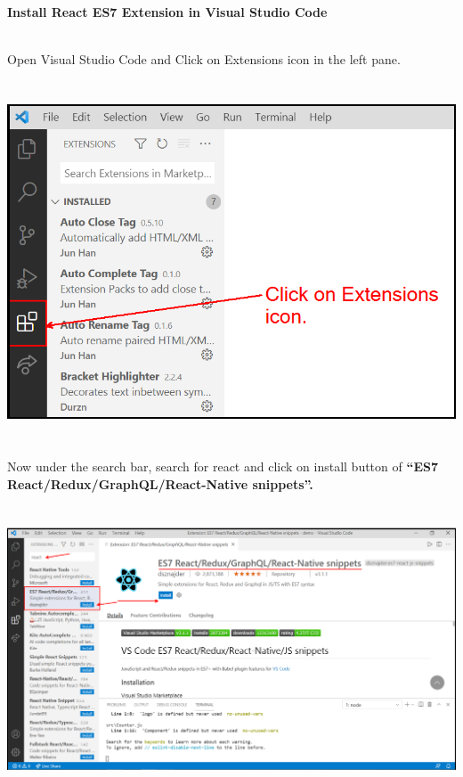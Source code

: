 \documentclass{article}
\begin{document}
\noindent \textbf{Install React ES7 Extension in Visual Studio Code}

\noindent 

\noindent\\
 Open Visual Studio Code and Click on Extensions icon in the left pane.

\noindent 

\begin{center}
	\noindent \includegraphics*[width=6.02in, height=4.22in]{IMG-07-01}
\end{center}

\noindent 

\noindent 

\noindent 

\noindent Now under the search bar, search for react and click on install button of \textbf{``ES7 React/Redux/GraphQL/React-Native snippets''.}

\noindent 

\begin{center}
	\noindent \includegraphics*[width=6.21in, height=3.34in]{IMG-07-02}
\end{center}
\end{document}
